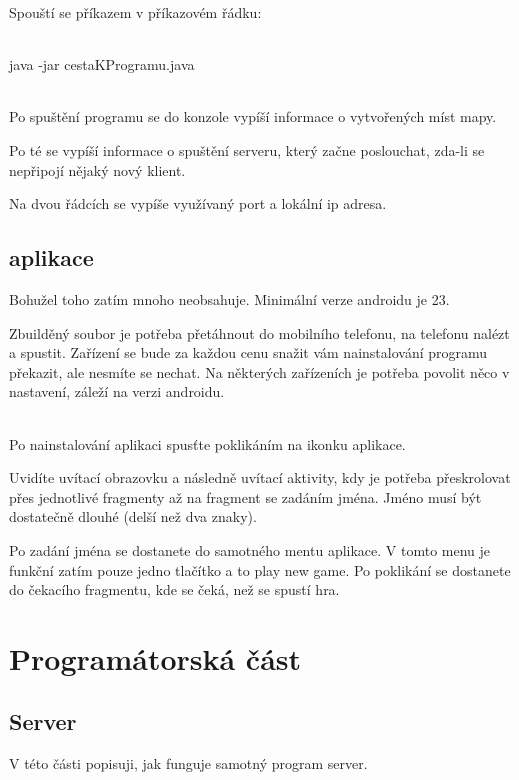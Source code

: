 \documentclass[12pt,a4paper]{report}
\begin{document}
Spouští se příkazem v příkazovém řádku:
\paragraph{}
java -jar cestaKProgramu.java

\paragraph{}

Po spuštění programu se do konzole vypíší informace o vytvořených míst mapy.

Po té se vypíší informace o spuštění serveru, který začne poslouchat, zda-li se nepřipojí nějaký nový klient.

Na dvou řádcích se vypíše využívaný port a lokální ip adresa.

\chapter{aplikace}

Bohužel toho zatím mnoho neobsahuje.
Minimální verze androidu je 23.

Zbuilděný soubor je potřeba přetáhnout do mobilního telefonu, na telefonu nalézt a spustit. Zařízení se bude za každou cenu snažit vám nainstalování programu překazit, ale nesmíte se nechat. Na některých zařízeních je potřeba povolit něco v nastavení, záleží na verzi androidu. 
\paragraph{}
Po nainstalování aplikaci spusťte poklikáním na ikonku aplikace.

Uvidíte uvítací obrazovku a následně uvítací aktivity, kdy je potřeba přeskrolovat přes jednotlivé fragmenty až na fragment se zadáním jména. Jméno musí být dostatečně dlouhé (delší než dva znaky).

Po zadání jména se dostanete do samotného mentu aplikace. V tomto menu je funkční zatím pouze jedno tlačítko a to play new game. Po poklikání se dostanete do čekacího fragmentu, kde se čeká, než se spustí hra. 

\part{Programátorská část}
\chapter{Server}
V této části popisuji, jak funguje samotný program server.
\end{document}

